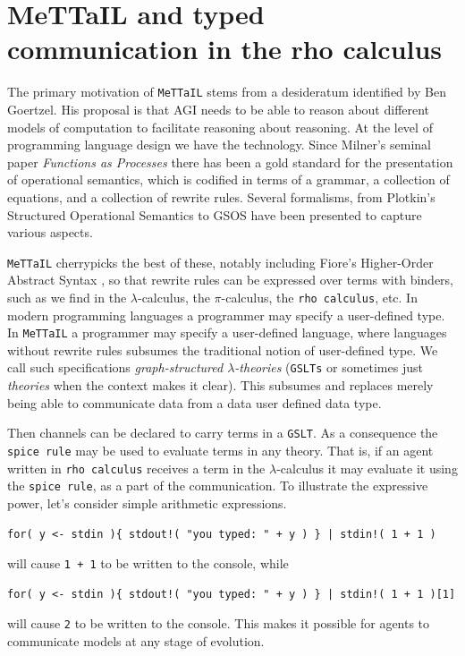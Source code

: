 \documentclass{article}
\newcommand{\code}[1]{\texttt{#1}}
\begin{document}
\section{MeTTaIL and typed communication in the rho calculus}

The primary motivation of \code{MeTTaIL} stems from a desideratum identified by Ben Goertzel. His proposal is that AGI needs to be able to reason about different models of computation to facilitate reasoning about reasoning. At the level of programming language design we have the technology. Since Milner's seminal paper \emph{Functions as Processes} \cite{DBLP:conf/icalp/Milner90} there has been a gold standard for the presentation of operational semantics, which is codified in terms of a grammar, a collection of equations, and a collection of rewrite rules. Several formalisms, from Plotkin's Structured Operational Semantics \cite{DBLP:journals/jlp/Plotkin04a} to GSOS \cite{DBLP:conf/lics/TuriP97} have been presented to capture various aspects.

\medskip

\code{MeTTaIL} cherrypicks the best of these, notably including Fiore's Higher-Order Abstract Syntax \cite{DBLP:journals/corr/abs-2201-03504}, so that rewrite rules can be expressed over terms with binders, such as we find in the $\lambda$-calculus, the $\pi$-calculus, the \code{rho calculus}, etc. In modern programming languages a programmer may specify a user-defined type. In \code{MeTTaIL} a programmer may specify a user-defined language, where languages without rewrite rules subsumes the traditional notion of user-defined type. We call such specifications \emph{graph-structured $\lambda$-theories} (\code{GSLTs} or sometimes just \emph{theories} when the context makes it clear). This subsumes and replaces merely being able to communicate data from a data user defined data type.

\medskip

Then channels can be declared to carry terms in a \code{GSLT}. As a consequence the \code{spice rule} may be used to evaluate terms in any theory. That is, if an agent written in \code{rho calculus} receives a term in the $\lambda$-calculus it may evaluate it using the \code{spice rule}, as a part of the communication. To illustrate the expressive power, let's consider simple arithmetic expressions.
\begin{verbatim}
for( y <- stdin ){ stdout!( "you typed: " + y ) } | stdin!( 1 + 1 )
\end{verbatim}
will cause \code{1 + 1} to be written to the console, while
\begin{verbatim}
for( y <- stdin ){ stdout!( "you typed: " + y ) } | stdin!( 1 + 1 )[1]
\end{verbatim}
will cause \code{2} to be written to the console. This makes it possible for agents to communicate models at any stage of evolution.
\end{document}
